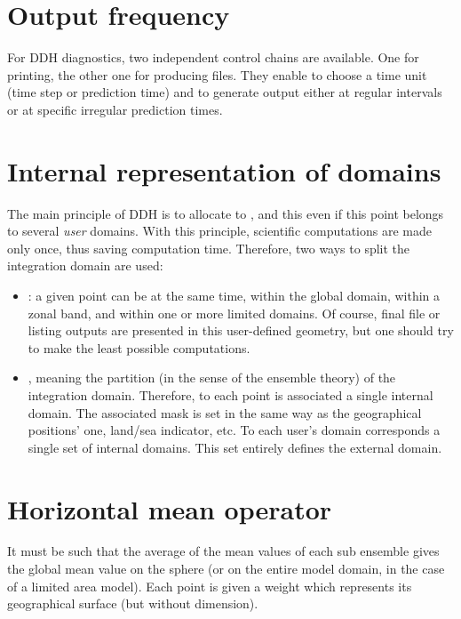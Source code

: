 \section{Output frequency} 

For DDH diagnostics, two independent control chains are available. One for
printing, the other one for producing files. They enable to choose a time unit
(time step or prediction time) and to generate output either at regular
intervals or at specific irregular prediction times.

\section{Internal representation of domains}
The main principle of DDH is to allocate  to , and this even if this point belongs to several {\em user} domains. With this principle, scientific computations are made only once, thus saving computation time. Therefore, two ways to split the integration domain are used:
\begin{itemize}
	\item {}: a given point can be at the same time, within the global domain, within a zonal band, and within one or more limited domains. Of course, final file or listing outputs are presented in this user-defined geometry, but one should try to make the least possible computations. 
	\item {}, meaning the partition (in the sense of
		the ensemble theory) of the integration domain. Therefore, to each point is
		associated a single internal domain. The associated mask is set in the
		same way as the geographical positions' one, land/sea indicator, etc. To each
		user's domain corresponds a single set of internal domains. This set entirely
		defines the external domain.
\end{itemize}
\section{Horizontal mean operator}

It must be such that the average of the mean values of each sub ensemble gives
the global mean value on the sphere (or on the entire model domain, in the case
of a limited area model). Each point is given a weight which represents its
geographical surface (but without dimension). 

